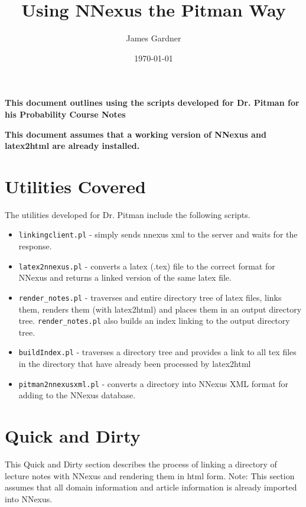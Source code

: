 \documentclass[10pt]{article}
\begin{document}
\title{Using NNexus the Pitman Way}
\author{James Gardner}
\date{\today}
\maketitle


{\bf This document outlines using the scripts developed for Dr. Pitman for his
Probability Course Notes}

{\bf This document assumes that a working version of NNexus and latex2html are already installed.}

\section{Utilities Covered}
The utilities developed for Dr. Pitman include the following scripts.
\begin{itemize}
\item \verb#linkingclient.pl# - simply sends nnexus xml to the server and waits for the response.
\item \verb#latex2nnexus.pl# - converts a latex (.tex) file to the correct format for NNexus and returns a linked version of the same latex file.

\item \verb#render_notes.pl# - traverses and entire directory tree of latex files,
links them, renders them (with latex2html) and places them in an output directory tree. \verb#render_notes.pl# also builds an index linking to the output directory tree.

\item \verb#buildIndex.pl# - traverses a directory tree and provides a link
to all tex files in the directory that have already been processed by latex2html

\item \verb#pitman2nnexusxml.pl# - converts a directory into NNexus XML format for
adding to the NNexus database.
\end{itemize}

\section{Quick and Dirty}
This Quick and Dirty section describes the process of linking a directory of lecture notes with NNexus and rendering them in html form. Note: This section assumes that all domain information and article information is already imported into NNexus.
\end{document}
